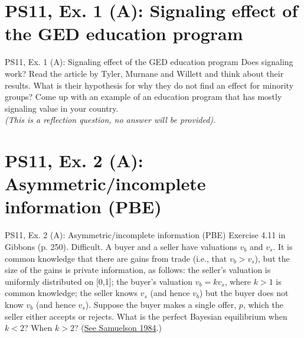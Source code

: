\section{PS11, Ex. 1 (A): Signaling effect of the GED education program}

\begin{frame}{PS11, Ex. 1 (A): Signaling effect of the GED education program}
    Does signaling work? Read the article by Tyler, Murnane and Willett and think about
    their results. What is their hypothesis for why they do not find an effect for minority groups? Come up with an example of an education program that has mostly signaling value in your country.\\\medskip
    \textit{(This is a reflection question, no answer will be provided).}
    \vfill\null
\end{frame}



\section{PS11, Ex. 2 (A): Asymmetric/incomplete information (PBE)}

\begin{frame}{PS11, Ex. 2 (A): Asymmetric/incomplete information (PBE)}
    Exercise 4.11 in Gibbons (p. 250). Difficult. A buyer and a seller have valuations $v_b$ and $v_s$. It is common knowledge that there are gains from trade (i.e., that $v_b > v_s$), but the size of the gains is private information, as follows: the seller’s valuation is uniformly distributed on [0,1]; the buyer’s valuation $v_b = kv_s$, where $k > 1$ is common knowledge; the seller knows $v_s$ (and hence $v_b$) but the buyer does not know $v_b$ (and hence $v_s$). Suppose the buyer makes a single offer, $p$, which the seller either accepts or rejects. What is the perfect Bayesian equilibrium when $k < 2$? When $k > 2$? (\href{https://www.jstor.org/stable/1911195}{See Samuelson 1984}.)
    \vfill\null
\end{frame}


